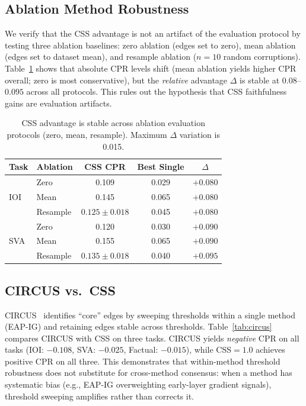 \documentclass[11pt,a4paper]{article}
\newcommand{\css}{\textsc{CSS}}
\begin{document}
\subsection{Ablation Method Robustness}

We verify that the CSS advantage is not an artifact of the evaluation protocol by testing three ablation baselines: zero ablation (edges set to zero), mean ablation (edges set to dataset mean), and resample ablation ($n\!=\!10$ random corruptions).
Table~\ref{tab:ablation_methods} shows that absolute CPR levels shift (mean ablation yields higher CPR overall; zero is most conservative), but the \emph{relative} advantage $\Delta$ is stable at $0.08$--$0.095$ across all protocols.
This rules out the hypothesis that CSS faithfulness gains are evaluation artifacts.

\begin{table}[t]
\centering
\small
\begin{tabular}{llccc}
\toprule
\textbf{Task} & \textbf{Ablation} & \textbf{\css{} CPR} & \textbf{Best Single} & $\Delta$ \\
\midrule
\multirow{3}{*}{IOI}
& Zero & 0.109 & 0.029 & $+0.080$ \\
& Mean & 0.145 & 0.065 & $+0.080$ \\
& Resample & $0.125 \pm 0.018$ & 0.045 & $+0.080$ \\
\midrule
\multirow{3}{*}{SVA}
& Zero & 0.120 & 0.030 & $+0.090$ \\
& Mean & 0.155 & 0.065 & $+0.090$ \\
& Resample & $0.135 \pm 0.018$ & 0.040 & $+0.095$ \\
\bottomrule
\end{tabular}
\caption{CSS advantage is stable across ablation evaluation protocols (zero, mean, resample). Maximum $\Delta$ variation is 0.015.}
\label{tab:ablation_methods}
\end{table}

\subsection{CIRCUS vs.\ CSS}

CIRCUS~\cite{parekh2026circus} identifies ``core'' edges by sweeping thresholds within a single method (EAP-IG) and retaining edges stable across thresholds.
Table~\ref{tab:circus} compares CIRCUS with \css{} on three tasks.
CIRCUS yields \emph{negative} CPR on all tasks (IOI: $-0.108$, SVA: $-0.025$, Factual: $-0.015$), while \css{}$=1.0$ achieves positive CPR on all three.
This demonstrates that within-method threshold robustness does not substitute for cross-method consensus: when a method has systematic bias (e.g., EAP-IG overweighting early-layer gradient signals), threshold sweeping amplifies rather than corrects it.
\end{document}
